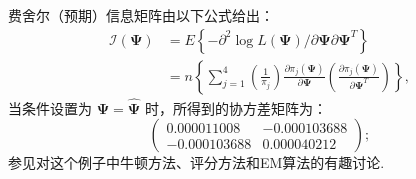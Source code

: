 \documentclass[UTF8,12pt]{ctexart}
\numberwithin{equation}{section}%
\begin{document}
	费舍尔（预期）信息矩阵由以下公式给出：
	$$
	\begin{aligned}
		\mathcal{I}(\boldsymbol{\Psi}) & =E\left\{-\partial^2 \log L(\boldsymbol{\Psi}) / \partial \boldsymbol{\Psi} \partial \boldsymbol{\Psi}^T\right\} \\
		& =n\left\{\sum_{j=1}^4\left(\frac{1}{\pi_j}\right) \frac{\partial \pi_j(\boldsymbol{\Psi})}{\partial \boldsymbol{\Psi}}\left(\frac{\partial \pi_j(\boldsymbol{\Psi})}{\partial \boldsymbol{\Psi}^T}\right)\right\},
	\end{aligned}
	$$
	当条件设置为 \(\boldsymbol{\Psi}=\hat{\boldsymbol{\Psi}}\) 时，所得到的协方差矩阵为：
	\[
	\left(\begin{array}{rr}
		0.000011008 & -0.000103688 \\
		-0.000103688 & 0.000040212
	\end{array}\right) ;
	\]
	参见\citet{monahan2011numerical}对这个例子中牛顿方法、评分方法和EM算法的有趣讨论.
	
\end{document}

